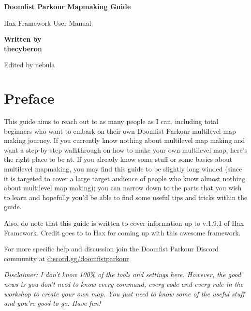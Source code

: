 \documentclass[12pt,a4paper]{article}
\begin{document}
\renewcommand{\familydefault}{\sfdefault}
\sffamily
\begin{titlepage}
    \begin{center}
        \vspace*{1cm}

        \Huge
        \textbf{Doomfist Parkour Mapmaking Guide}

        \vspace{0.5cm}
        \Large
        Hax Framework User Manual
            
        \vspace{1.5cm}

        \textbf{Written by \\
        thecyberon}
        
        \vfill
            
        Edited by nebula
            
        \vspace{0.8cm}
    
            
    \end{center}
\end{titlepage}
\tableofcontents
{}
\newpage
\section{Preface}

    This guide aims to reach out to as many people as I can, including total beginners who want to 
embark on their own Doomfist Parkour multilevel map making journey. If you currently know 
nothing about multilevel map making and want a step-by-step walkthrough on how to make your 
own multilevel map, here’s the right place to be at. If you already know some stuff or some 
basics about multilevel mapmaking, you may find this guide to be slightly long winded (since it 
is targeted to cover a large target audience of people who know almost nothing about multilevel 
map making); you can narrow down to the parts that you wish to learn and hopefully you’d be 
able to find some useful tips and tricks within the guide. 

Also, do note that this guide is written to cover 
information up to
v.1.9.1 of Hax Framework.
Credit goes to to Hax for coming up with this awesome framework.

For more specific help and discussion join the Doomfist Parkour Discord community at \url{discord.gg/doomfistparkour}

\textit{Disclaimer: I don’t know 100\% of the tools and settings here. However, the good news is you 
don’t need to know every command, every code and every rule in the workshop to create your 
own map. You just need to know some of the useful stuff and you’re good to go. Have fun!}
\end{document}
